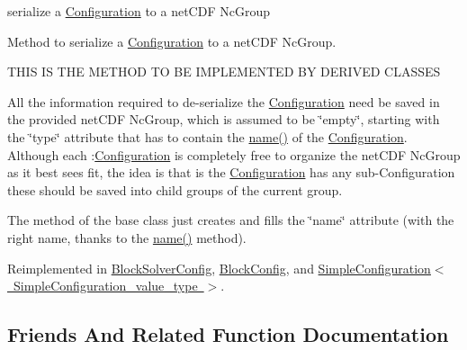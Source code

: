 serialize a \mbox{\hyperlink{class_s_m_spp__di__unipi__it_1_1_configuration}{Configuration}} to a net\+C\+DF Nc\+Group 

Method to serialize a \mbox{\hyperlink{class_s_m_spp__di__unipi__it_1_1_configuration}{Configuration}} to a net\+C\+DF Nc\+Group. \begin{DoxyVerb}THIS IS THE METHOD TO BE IMPLEMENTED BY DERIVED CLASSES
\end{DoxyVerb}


All the information required to de-\/serialize the \mbox{\hyperlink{class_s_m_spp__di__unipi__it_1_1_configuration}{Configuration}} need be saved in the provided net\+C\+DF Nc\+Group, which is assumed to be \char`\"{}empty\char`\"{}, starting with the \char`\"{}type\char`\"{} attribute that has to contain the \mbox{\hyperlink{class_s_m_spp__di__unipi__it_1_1_configuration_a738e9dfd6e00507da219e4bd5a3f6be9}{name()}} of the \mbox{\hyperlink{class_s_m_spp__di__unipi__it_1_1_configuration}{Configuration}}. Although each \+:\mbox{\hyperlink{class_s_m_spp__di__unipi__it_1_1_configuration}{Configuration}} is completely free to organize the net\+C\+DF Nc\+Group as it best sees fit, the idea is that is the \mbox{\hyperlink{class_s_m_spp__di__unipi__it_1_1_configuration}{Configuration}} has any sub-\/\+Configuration these should be saved into child groups of the current group.

The method of the base class just creates and fills the \char`\"{}name\char`\"{} attribute (with the right name, thanks to the \mbox{\hyperlink{class_s_m_spp__di__unipi__it_1_1_configuration_a738e9dfd6e00507da219e4bd5a3f6be9}{name()}} method). 

Reimplemented in \mbox{\hyperlink{class_s_m_spp__di__unipi__it_1_1_block_solver_config_a8a626d908100f4419905d89f771150aa}{Block\+Solver\+Config}}, \mbox{\hyperlink{class_s_m_spp__di__unipi__it_1_1_block_config_a8a626d908100f4419905d89f771150aa}{Block\+Config}}, and \mbox{\hyperlink{class_s_m_spp__di__unipi__it_1_1_simple_configuration_a8a626d908100f4419905d89f771150aa}{Simple\+Configuration$<$ Simple\+Configuration\+\_\+value\+\_\+type $>$}}.



\subsection{Friends And Related Function Documentation}
\mbox{\label{class_s_m_spp__di__unipi__it_1_1_configuration_ad9926988904739fe7789505dc5292685}} 
